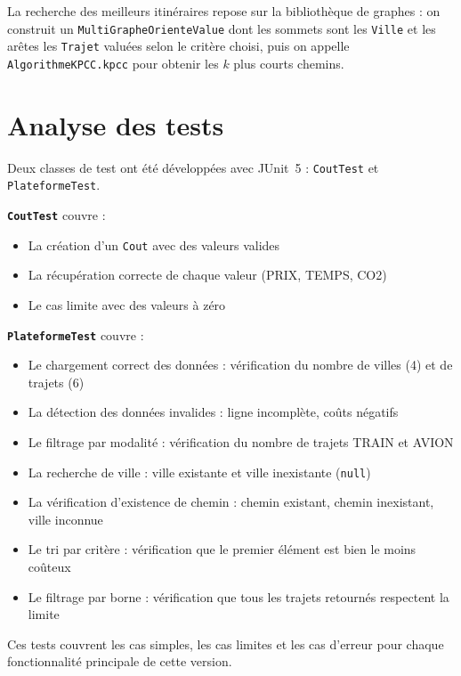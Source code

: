 \documentclass[fontsize=10pt,oneside,parskip=half]{scrreprt}
\newcommand{\ic}[1]{{\setlength{\fboxsep}{2pt}\colorbox{BeigeSerein}{\texttt{#1}}}}
\begin{document}
La recherche des meilleurs itinéraires repose sur la bibliothèque de graphes : on
construit un \ic{MultiGrapheOrienteValue} dont les sommets sont les \ic{Ville} et
les arêtes les \ic{Trajet} valuées selon le critère choisi, puis on appelle
\ic{AlgorithmeKPCC.kpcc} pour obtenir les $k$ plus courts chemins.

\section{Analyse des tests}

Deux classes de test ont été développées avec JUnit~5 : \ic{CoutTest} et
\ic{PlateformeTest}.

\noindent\textbf{\ic{CoutTest}} couvre :
\begin{itemize}
  \item La création d'un \ic{Cout} avec des valeurs valides
  \item La récupération correcte de chaque valeur (PRIX, TEMPS, CO2)
  \item Le cas limite avec des valeurs à zéro
\end{itemize}

\noindent\textbf{\ic{PlateformeTest}} couvre :
\begin{itemize}
  \item Le chargement correct des données : vérification du nombre de villes (4) et de trajets (6)
  \item La détection des données invalides : ligne incomplète, coûts négatifs
  \item Le filtrage par modalité : vérification du nombre de trajets TRAIN et AVION
  \item La recherche de ville : ville existante et ville inexistante (\ic{null})
  \item La vérification d'existence de chemin : chemin existant, chemin inexistant, ville inconnue
  \item Le tri par critère : vérification que le premier élément est bien le moins coûteux
  \item Le filtrage par borne : vérification que tous les trajets retournés respectent la limite
\end{itemize}

Ces tests couvrent les cas simples, les cas limites et les cas d'erreur pour chaque
fonctionnalité principale de cette version.
\end{document}
